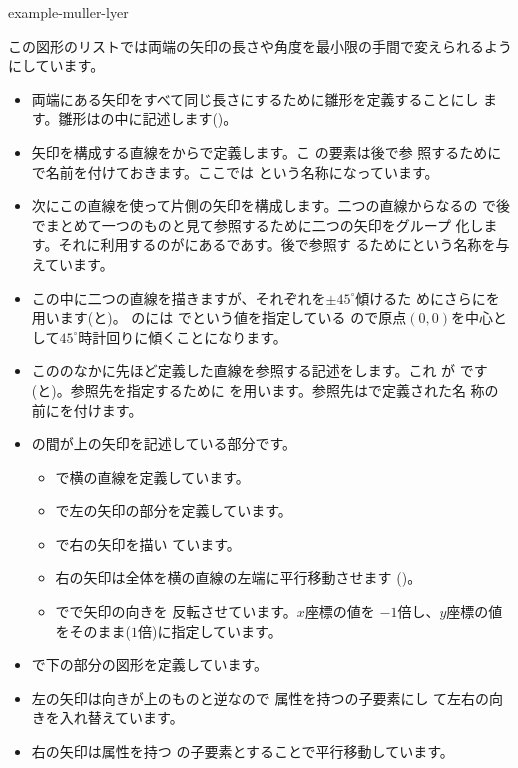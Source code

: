 {example-muller-lyer}

この図形のリストでは両端の矢印の長さや角度を最小限の手間で変えられるよう
にしています。
{}
\begin{itemize}
 \item 両端にある矢印をすべて同じ長さにするために雛形を定義することにし
       ます。雛形はの中に記述します()。
 \item 矢印を構成する直線をからで定義します。こ
       の要素は後で参
       照するためにで名前を付けておきます。ここでは
       という名称になっています。
 \item 次にこの直線を使って片側の矢印を構成します。二つの直線からなるの
       で後でまとめて一つのものと見て参照するために二つの矢印をグループ
       化します。それに利用するのがにあるであす。後で参照す
       るためにという名称を与えています。
 \item この中に二つの直線を描きますが、それぞれを$\pm45^{\circ}$傾けるた
       めにさらにを用います(と)。
       のには 
       でという値を指定している
       ので原点$(0,0)$を中心として$45^{\circ}$時計回りに傾くことになります。
 \item こののなかに先ほど定義した直線を参照する記述をします。これ
       が  です(と)。参照先を指定するために
       を用います。参照先はで定義された名
       称の前に\AttribVal{\#}{}を付けます。
 \item {}の間が上の矢印を記述している部分です。
\begin{itemize}
 \item {}で横の直線を定義しています。
 \item {}で左の矢印の部分を定義しています。
 \item {}で右の矢印を描い
       ています。
 \item 右の矢印は全体を横の直線の左端に平行移動させます
       ()。
 \item {}でで矢印の向きを
       反転させています。$x$座標の値を
       $-1$倍し、$y$座標の値をそのまま($1$倍)に指定しています。
\end{itemize}
 \item {}で下の部分の図形を定義しています。
 \item 左の矢印は向きが上のものと逆なので
       属性を持つの子要素にし
       て左右の向きを入れ替えています。
 \item 右の矢印は属性を持つ
       の子要素とすることで平行移動しています。
\end{itemize}
